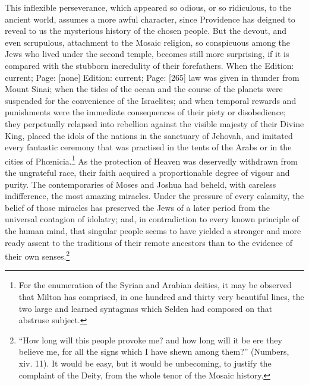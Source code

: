 This inflexible perseverance, which appeared so odious, or so ridiculous, to the ancient world, assumes a more awful character, since Providence has deigned to reveal to us the mysterious history of the chosen people. But the devout, and even scrupulous, attachment to the Mosaic religion, so conspicuous among the Jews who lived under the second temple, becomes still more surprising, if it is compared with the stubborn incredulity of their forefathers. When the Edition: current; Page: [none] Edition: current; Page: [265] law was given in thunder from Mount Sinai; when the tides of the ocean and the course of the planets were suspended for the convenience of the Israelites; and when temporal rewards and punishments were the immediate consequences of their piety or disobedience; they perpetually relapsed into rebellion against the visible majesty of their Divine King, placed the idols of the nations in the sanctuary of Jehovah, and imitated every fantastic ceremony that was practised in the tents of the Arabs or in the cities of Phœnicia.\footnote{For the enumeration of the Syrian and Arabian deities, it may be observed that Milton has comprised, in one hundred and thirty very beautiful lines, the two large and learned syntagmas which Selden had composed on that abstruse subject.} As the protection of Heaven was deservedly withdrawn from the ungrateful race, their faith acquired a proportionable degree of vigour and purity. The contemporaries of Moses and Joshua had beheld, with careless indifference, the most amazing miracles. Under the pressure of every calamity, the belief of those miracles has preserved the Jews of a later period from the universal contagion of idolatry; and, in contradiction to every known principle of the human mind, that singular people seems to have yielded a stronger and more ready assent to the traditions of their remote ancestors than to the evidence of their own senses.\footnote{\texthebrew{“}How long will this people provoke me? and how long will it be ere they believe me, for all the signs which I have shewn among them?\texthebrew{}” (Numbers, xiv. 11). It would be easy, but it would be unbecoming, to justify the complaint of the Deity, from the whole tenor of the Mosaic history.}

